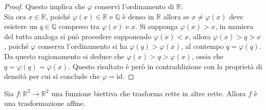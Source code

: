 \begin{proof}
	Questo implica che $\varphi$ conservi l'ordinamento di $\mathbb{R}$.\\
	Sia ora $x\in\mathbb{R}$, poiché $\varphi(x)\in\mathbb{R}$ e $\mathbb{Q}$ è denso in $\mathbb{R}$ allora se $x\neq\varphi(x)$ deve esistere un $q\in\mathbb{Q}$ compreso tra $\varphi(x)$ e $x$. Si supponga $\varphi(x)>x$, in maniera del tutto analoga si può procedere supponendo $\varphi(x)<x$, allora $\varphi(x)> q> x$, poiché $\varphi$ conserva l'ordinamento si ha $\varphi(q)>\varphi(x)$, al contempo $q=\varphi(q)$. Da questo ragionamento si deduce che $\varphi(x)> q>\varphi(x)$, ossia che $q=\varphi(q)=\varphi(x)$. Questo risultato è però in contraddizione con la proprietà di densità per cui si conclude che $\varphi=\text{id}$.
\end{proof}
\begin{thm}
	Sia $f:\mathbb{R}^2\rightarrow\mathbb{R}^2$ una funzione biettiva che trasforma rette in altre rette. Allora $f$ è una trasformazione affine. 
	\label{thm:LinGen2}
\end{thm}
